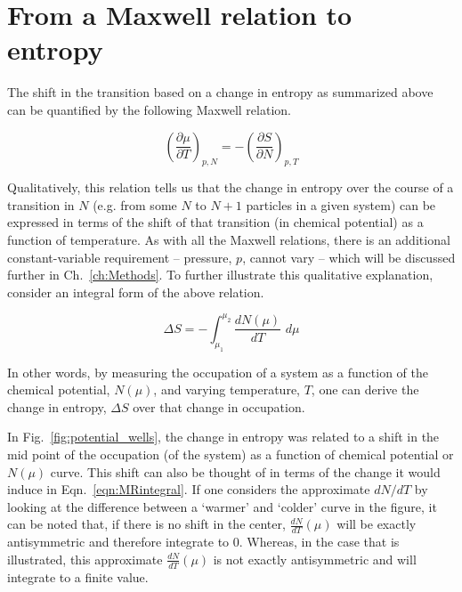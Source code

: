 \section{From a Maxwell relation to entropy}
\label{sec:mrtoentropy}

The shift in the transition based on a change in entropy as summarized above can be quantified by the following Maxwell relation.

\begin{equation}
	\label{eqn:MR}
	\left( \frac{\partial \mu }{\partial T} \right)_{p,N} = -\left( \frac{\partial S}{\partial N} \right)_{p,T}
\end{equation}


Qualitatively, this relation tells us that the change in entropy over the course of a transition in $N$ (e.g. from some $N$ to $N+1$ particles in a given system) can be expressed in terms of the shift of that transition (in chemical potential) as a function of temperature. As with all the Maxwell relations, there is an additional constant-variable requirement -- pressure, $p$, cannot vary -- which will be discussed further in Ch.~\ref{ch:Methods}. To further illustrate this qualitative explanation, consider an integral form of the above relation.

\begin{equation}
	\label{eqn:MRintegral}
	\Delta S = - \int_{\mu_1}^{\mu_2} \frac{dN(\mu)}{dT}\,\, d\mu
\end{equation}

In other words, by measuring the occupation of a system as a function of the chemical potential, $N(\mu)$, and varying temperature, $T$, one can derive the change in entropy, $\Delta S$ over that change in occupation. 

In Fig.~\ref{fig:potential_wells}, the change in entropy was related to a shift in the mid point of the occupation (of the system) as a function of chemical potential or $N(\mu)$ curve. This shift can also be thought of in terms of the change it would induce in Eqn.~\ref{eqn:MRintegral}. If one considers the approximate $dN/dT$ by looking at the difference between a `warmer' and `colder' curve in the figure, it can be noted that, if there is no shift in the center, $\frac{dN}{dT} (\mu)$ will be exactly antisymmetric and therefore integrate to 0. Whereas, in the case that is illustrated, this approximate $\frac{dN}{dT} (\mu)$  is not exactly antisymmetric and will integrate to a finite value.

